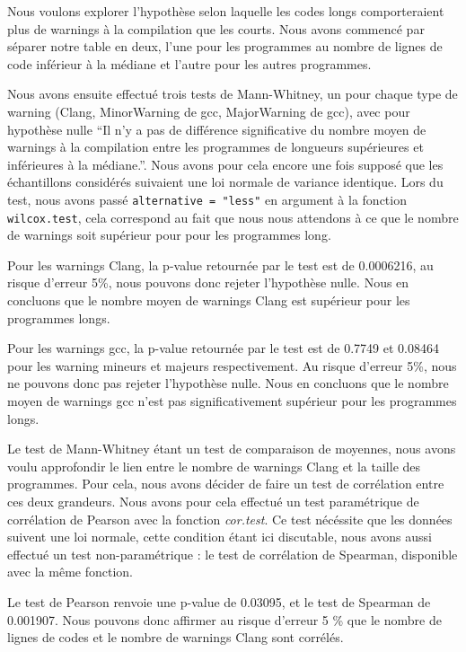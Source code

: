 Nous voulons explorer l'hypothèse selon laquelle les codes longs
comporteraient plus de warnings à la compilation que les courts. Nous
avons commencé par séparer notre table en deux, l'une pour les
programmes au nombre de lignes de code inférieur à la médiane et
l'autre pour les autres programmes. 

Nous avons ensuite effectué trois tests de Mann-Whitney, un pour chaque
type de warning (Clang, MinorWarning de gcc, MajorWarning de gcc),
avec pour hypothèse nulle ``Il n'y a pas de différence significative
du nombre moyen de warnings à la compilation entre les programmes de
longueurs supérieures et inférieures à la médiane.''. Nous avons pour
cela encore une fois supposé que les échantillons considérés suivaient
une loi normale de variance identique. Lors du test, nous avons passé
\lstinline{alternative = "less"} en argument à la fonction
\lstinline{wilcox.test}, cela correspond au fait que nous nous attendons à
ce que le nombre de warnings soit supérieur pour pour les programmes
long.

Pour les warnings Clang, la p-value retournée par le test est de
0.0006216, au risque d'erreur 5\%, nous pouvons donc rejeter
l'hypothèse nulle. Nous en concluons que le nombre moyen de warnings Clang
est supérieur pour les programmes longs.

Pour les warnings gcc, la p-value retournée par le test est de 0.7749
et 0.08464 pour les warning mineurs et majeurs respectivement. Au
risque d'erreur 5\%, nous ne pouvons donc pas rejeter l'hypothèse
nulle. Nous en concluons que le nombre moyen de warnings gcc n'est pas
significativement supérieur pour les programmes longs.

Le test de Mann-Whitney étant un test de comparaison de moyennes, nous
avons voulu approfondir le lien entre le nombre de warnings Clang et la
taille des programmes. Pour cela, nous avons décider de faire un test de
corrélation entre ces deux grandeurs. Nous avons pour cela effectué un
test paramétrique de corrélation de Pearson avec la fonction
\emph{cor.test}. Ce test nécéssite que les données suivent une loi
normale, cette condition étant ici discutable, nous avons aussi
effectué un test non-paramétrique : le test de
corrélation de Spearman, disponible avec la même fonction. 

Le test de Pearson renvoie une p-value de 0.03095, et le test de
Spearman de 0.001907. Nous pouvons donc affirmer au risque d'erreur 5 \%
que le nombre de lignes de codes et le nombre de warnings Clang sont
corrélés.

